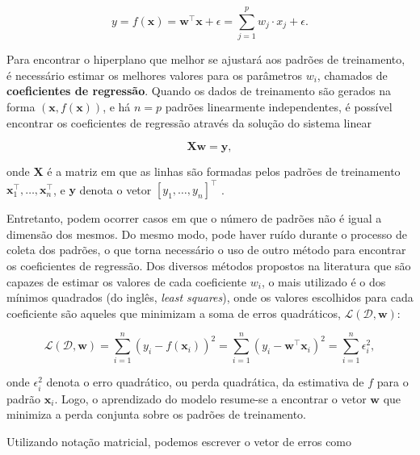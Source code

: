 \begin{equation}
    \label{ch2:eq2}
    y = f(\mathbf{x}) = \mathbf{w}^{\top}\mathbf{x} + \epsilon = \sum_{j=1}^{p}{w_j \cdot x_j} + \epsilon.
\end{equation}

Para encontrar o hiperplano que melhor se ajustará aos padrões de treinamento, é necessário estimar os melhores valores para os parâmetros $w_i$, chamados de \textbf{coeficientes de regressão}. Quando os dados de treinamento são gerados na forma $(\mathbf{x}, f(\mathbf{x}))$, e há $n = p$ padrões linearmente independentes, é possível encontrar os coeficientes de regressão através da solução do sistema linear

\begin{equation}
    \label{ch2:eq3}
    \mathbf{X}\mathbf{w} = \mathbf{y},
\end{equation}

\noindent onde $\mathbf{X}$ é a matriz em que as linhas são formadas pelos padrões de treinamento $\mathbf{x}^{\top}_1,\ldots,\mathbf{x}^{\top}_n$, e $\mathbf{y}$ denota o vetor $[y_1,\ldots,y_n]^{\top}$ \cite{shawe2004}.

Entretanto, podem ocorrer casos em que o número de padrões não é igual a dimensão dos mesmos. Do mesmo modo, pode haver ruído durante o processo de coleta dos padrões, o que torna necessário o uso de outro método para encontrar os coeficientes de regressão. Dos diversos métodos propostos na literatura que são capazes de estimar os valores de cada coeficiente $w_i$, o mais utilizado é o dos mínimos quadrados (do inglês, \textit{least squares}), onde os valores escolhidos para cada coeficiente são aqueles que minimizam a soma de erros quadráticos, $\mathcal{L}(\mathcal{D}, \mathbf{w})$:

\begin{equation}
    \label{ch2:eq4}
    \mathcal{L}(\mathcal{D}, \mathbf{w}) = \sum_{i=1}^{n}{(y_i - f(\mathbf{x}_i))^2} = \sum_{i=1}^{n}{(y_i - \mathbf{w}^{\top}\mathbf{x}_i)^2} = \sum_{i=1}^{n}{\epsilon_{i}^2},
\end{equation}

\noindent onde $\epsilon_{i}^2$ denota o erro quadrático, ou perda quadrática, da estimativa de $f$ para o padrão $\mathbf{x}_i$. Logo, o aprendizado do modelo resume-se a encontrar o vetor $\mathbf{w}$ que minimiza a perda conjunta sobre os padrões de treinamento.

Utilizando notação matricial, podemos escrever o vetor de erros como

